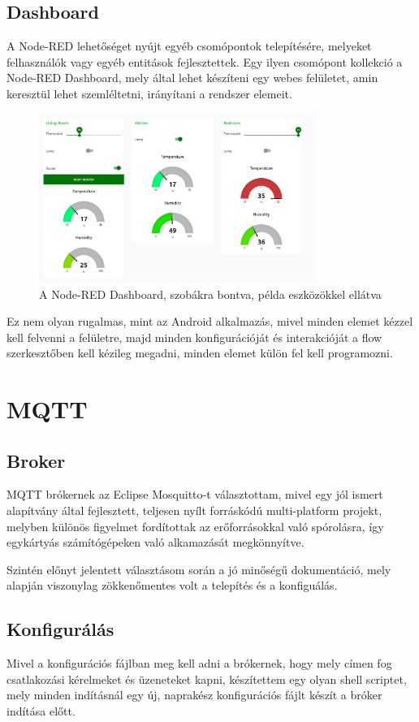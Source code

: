 \documentclass[
]{thesis-ekf}
\theoremstyle{definition}
\theoremstyle{remark}
\begin{document}
\subsection{Dashboard}
A Node-RED lehetőséget nyújt egyéb csomópontok telepítésére, melyeket felhasználók vagy egyéb entitások fejlesztettek. 
Egy ilyen csomópont kollekció a Node-RED Dashboard\cite{dashboard}, mely által lehet készíteni egy webes felületet, amin keresztül lehet szemléltetni, irányítani a rendszer elemeit. 
\begin{figure}[h]
	\centering
	\includegraphics[width=0.8\textwidth]{images/dashboard.jpg}
	\caption{A Node-RED Dashboard\cite{dashboard}, szobákra bontva, példa eszközökkel ellátva}
\end{figure}


Ez nem olyan rugalmas, mint az Android alkalmazás, mivel minden
elemet kézzel kell felvenni a felületre, majd minden konfigurációját és interakcióját a flow szerkesztőben kell kézileg megadni, minden elemet külön fel kell programozni.

\section{MQTT}
\subsection{Broker}
MQTT brókernek az Eclipse Mosquitto\cite{mosquitto}-t választottam, mivel egy jól ismert alapítvány által fejlesztett, teljesen nyílt forráskódú multi-platform projekt,
melyben különös figyelmet fordítottak az erőforrásokkal való spórolásra, így egykártyás számítógépeken való alkamazását megkönnyítve. 

Szintén előnyt jelentett választásom során a jó minőségű dokumentáció, mely alapján
viszonylag zökkenőmentes volt a telepítés és a konfiguálás.
\subsection{Konfigurálás}
Mivel a konfigurációs fájlban meg kell adni a brókernek, hogy mely címen fog csatlakozási kérelmeket és üzeneteket kapni,
készítettem egy olyan shell scriptet, mely minden indításnál egy új, naprakész konfigurációs fájlt készít a bróker indítása előtt.
\end{document}
